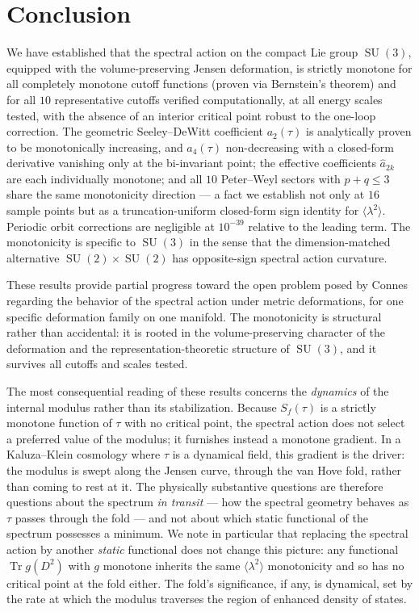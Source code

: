\documentclass[12pt]{article}
\theoremstyle{definition}
\theoremstyle{remark}
\DeclareMathOperator{\Tr}{Tr}
\DeclareMathOperator{\SU}{SU}
\begin{document}
\section{Conclusion}\label{sec:conclusion}

We have established that the spectral action on the compact Lie group
$\SU(3)$, equipped with the volume-preserving Jensen deformation, is
strictly monotone for all completely monotone cutoff functions (proven
via Bernstein's theorem) and for all $10$ representative cutoffs verified
computationally, at all energy scales tested, with the absence of an
interior critical point robust to the one-loop correction.  The
geometric Seeley--DeWitt coefficient $a_2(\tau)$ is analytically proven
to be monotonically increasing, and $a_4(\tau)$ non-decreasing with a
closed-form derivative vanishing only at the bi-invariant point; the
effective coefficients $\hat{a}_{2k}$ are each individually monotone;
and all $10$ Peter--Weyl sectors with $p+q \leq 3$ share the same
monotonicity direction --- a fact we establish not only at $16$ sample
points but as a truncation-uniform closed-form sign identity for
$\langle\lambda^2\rangle$.  Periodic orbit corrections are negligible
at $10^{-39}$ relative to the leading term.  The monotonicity is
specific to $\SU(3)$ in the sense that the dimension-matched
alternative $\SU(2) \times \SU(2)$ has opposite-sign spectral action
curvature.

These results provide partial progress toward the open problem posed by
Connes \cite{Connes2019} regarding the behavior of the
spectral action under metric deformations, for one specific deformation
family on one manifold.  The monotonicity is structural rather than
accidental: it is rooted in the volume-preserving character of the
deformation and the representation-theoretic structure of $\SU(3)$, and
it survives all cutoffs and scales tested.

The most consequential reading of these results concerns the
\emph{dynamics} of the internal modulus rather than its
stabilization.  Because $S_f(\tau)$ is a strictly monotone function of
$\tau$ with no critical point, the spectral action does not select a
preferred value of the modulus; it furnishes instead a monotone
gradient.  In a Kaluza--Klein cosmology where $\tau$ is a dynamical
field, this gradient is the driver: the modulus is swept along the
Jensen curve, through the van Hove fold, rather than coming to rest at
it.  The physically substantive questions are therefore questions about
the spectrum \emph{in transit} --- how the spectral geometry behaves as
$\tau$ passes through the fold --- and not about which static functional
of the spectrum possesses a minimum.  We note in particular that
replacing the spectral action by another \emph{static} functional does
not change this picture: any functional $\Tr g(D^2)$ with $g$ monotone
inherits the same $\langle\lambda^2\rangle$ monotonicity and so has no
critical point at the fold either.  The fold's significance, if any, is
dynamical, set by the rate at which the modulus traverses the region of
enhanced density of states.
\end{document}
